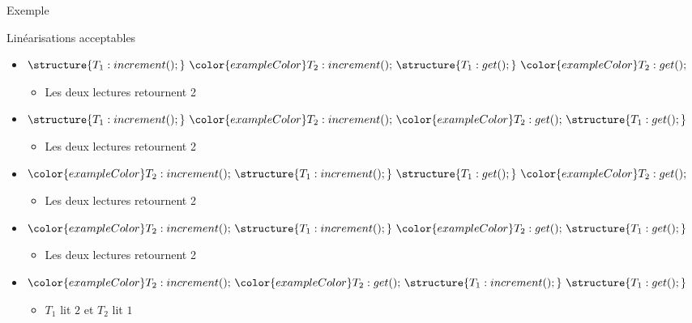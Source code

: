 \begin{frame}[fragile]{Exemple}
\begin{center}
{\begin{tikzpicture}
\end{tikzpicture}
}
\end{center}
\pause
\begin{alertblock}{Linéarisations acceptables}
      \begin{itemize}
      \item $\structure{T_1:increment();}~{\color{exampleColor}T_2:increment();}~\structure{T_1:get();}~{\color{exampleColor}T_2:get();}$
        \begin{itemize}
        \item Les deux lectures retournent 2
        \end{itemize}
        \pause
      \item $\structure{T_1:increment();}~{\color{exampleColor}T_2:increment();}~{\color{exampleColor}T_2:get();}~\structure{T_1:get();}$
        \begin{itemize}
        \item Les deux lectures retournent 2
        \end{itemize}
        \pause
      \item ${\color{exampleColor}T_2:increment();}~\structure{T_1:increment();}~\structure{T_1:get();}~{\color{exampleColor}T_2:get();}$
        \begin{itemize}
        \item Les deux lectures retournent 2
        \end{itemize}
        \pause
      \item ${\color{exampleColor}T_2:increment();}~\structure{T_1:increment();}~{\color{exampleColor}T_2:get();}~\structure{T_1:get();}$
        \begin{itemize}
        \item Les deux lectures retournent 2
        \end{itemize}
        \pause
      \item ${\color{exampleColor}T_2:increment();}~{\color{exampleColor}T_2:get();}~\structure{T_1:increment();}~\structure{T_1:get();}$
        \begin{itemize}
        \item $T_1$ lit $2$ et $T_2$ lit $1$
        \end{itemize}
      \end{itemize}
      \end{alertblock}

\end{frame}





